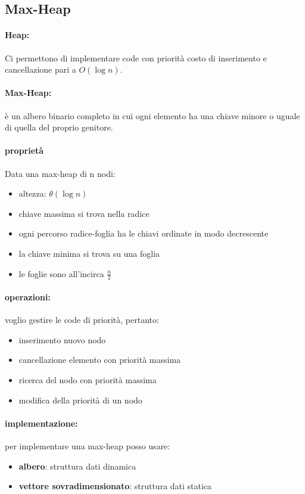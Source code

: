 \documentclass{article}
\begin{document}
\subsection{Max-Heap} %
\paragraph{Heap:} Ci permettono di implementare code con priorità costo di inserimento e cancellazione pari a $O(\log n)$.

\paragraph{Max-Heap:} è un albero binario completo in cui ogni elemento ha una chiave minore o uguale di quella 
del proprio genitore.

\paragraph{proprietà} 
Data una max-heap di n nodi:
\begin{itemize}
    \item altezza: $\theta(\log n)$
    \item chiave massima si trova nella radice
    \item ogni percorso radice-foglia ha le chiavi ordinate in modo decrescente
    \item la chiave minima si trova su una foglia
    \item le foglie sono all'incirca $\frac{n}{2}$
\end{itemize}

\paragraph{operazioni:}
voglio gestire le code di priorità, pertanto:
\begin{itemize}
    \item inserimento nuovo nodo
    \item cancellazione elemento con priorità massima
    \item ricerca del nodo con priorità massima
    \item modifica della priorità di un nodo
\end{itemize}

\paragraph{implementazione:} per implementare una max-heap posso usare:
\begin{itemize}
    \item \textbf{albero}: struttura dati dinamica 
    \item \textbf{vettore sovradimensionato}: struttura dati statica
\end{itemize}
\end{document}
